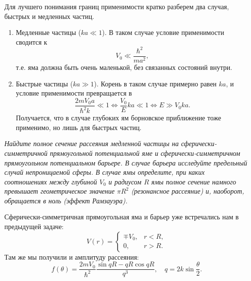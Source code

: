 \begin{itemize}
        Для лучшего понимания границ применимости кратко разберем два случая, быстрых и
        медленных частиц.
        \begin{enumerate}
          \item Медленные частицы ($ka\ll1$). В таком случае условие применимости сводится к
                \[
                  V_0\ll \frac{\hbar^2}{ma^2},
                \]
                т.е. яма должна быть очень маленькой, без связанных состояний внутри.
          \item Быстрые частицы ($ka\gg1$). Корень в таком случае примерно равен $ka$, и
                условие применимости превращается в
                \[
                  \frac{2mV_0a}{\hbar^2k}\ll1 \Longleftrightarrow
                  \frac{V_0}{E}ka\ll1 \Longleftrightarrow E\gg V_0 ka.
                \]
                Получается, что в случае глубоких ям борновское приближение тоже применимо, но
                лишь для быстрых частиц.
        \end{enumerate}
\end{itemize}

\qedsq

\begin{exercise}
  \textit{Найдите полное сечение рассеяния медленной частицы на
    сферически-симметричной прямоугольной потенциальной яме и
    сферически-симметричном прямоугольном потенциальном барьере. В случае барьера
    исследуйте предельный случай непроницаемой сферы. В случае ямы определите, при
    каких соотношениях между глубиной $V_0$ и радиусом $R$ ямы полное сечение
    намного превышает геометрическое значение $\pi R^2$ (резонансное рассеяние) и,
    наоборот, обращается в ноль (эффект Рамзауэра).}
\end{exercise}

Сферически-симметричная прямоугольная яма и барьер уже встречались нам в
предыдущей задаче:
\[
  V(r) = \begin{cases}
    \mp V_0, & r<R, \\ 0, & r>R.
  \end{cases}
\]
Там же мы получили и амплитуду рассеяния:
\[
  f(\theta) = \frac{2mV_0}{\hbar^2}\frac{\sin qR - qR\cos qR}{q^3}, \quad q = 2k\sin\frac{\theta}{2}.
\]

